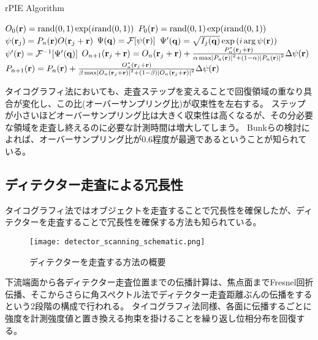 \begin{algorithm}[!ht]
\caption{rPIE Algorithm}         
\label{alg:rpie}                          
\begin{algorithmic}
    \STATE $O_0(\mathbf{r}) = \mathrm{rand}(0,1) \exp(i \mathrm{rand}(0,1) )$
    \STATE $P_0(\mathbf{r}) = \mathrm{rand}(0,1) \exp(i \mathrm{rand}(0,1) )$
        \STATE $\psi(\mathbf{r}_j) = P_n(\mathbf{r}) O(\mathbf{r}_j + \mathbf{r})$
        \STATE $\Psi(\mathbf{q}) = \mathcal F [\psi(\mathbf{r})]$
        \STATE $\Psi'(\mathbf{q}) = \sqrt{I_j(\mathbf{q})} \exp\left( i \arg \psi(\mathbf{r}) \right)$ 
        \STATE $\psi'(\mathbf{r}) = \mathcal F^{-1} [\Psi'(\mathbf{q})]$
        \STATE $O_{n+1}(\mathbf{r}_j + \mathbf{r}) 
          = O_n(\mathbf{r}_j + \mathbf{r}) + \frac{P_n^*(\mathbf{r}_j + \mathbf{r})}
          {\alpha \max \left| P_n(\mathbf{r}) \right|^2 + (1-\alpha) \left| P_n(\mathbf{r}) \right|^2}
          \Delta\psi(\mathbf{r})$
        \STATE $P_{n+1}(\mathbf{r})
          = P_n(\mathbf{r}) + \frac{O_n^*(\mathbf{r}_j + \mathbf{r})}
          {\beta \max \left| O_n(\mathbf{r}_j + \mathbf{r}) \right|^2 + (1-\beta) \left| O_n(\mathbf{r}_j + \mathbf{r}) \right|^2}
          \Delta\psi(\mathbf{r})$
      \ENDFOR
    \ENDFOR
\end{algorithmic}
\end{algorithm}

タイコグラフィ法においても、走査ステップを変えることで回復領域の重なり具合が変化し、この比(オーバーサンプリング比)が収束性を左右する。
ステップが小さいほどオーバーサンプリング比は大きく収束性は高くなるが、その分必要な領域を走査し終えるのに必要な計測時間は増大してしまう。
Bunkらの検討によれば、オーバーサンプリング比が0.6程度が最適であるということが知られている。\cite{Bunk2008}

\subsection{ディテクター走査による冗長性}
\label{chap3_detector_scanninc_introduction}

タイコグラフィ法ではオブジェクトを走査することで冗長性を確保したが、ディテクターを走査することで冗長性を確保する方法も知られている。

\begin{figure}[!ht]
\centering
\texttt{[image: detector\_scanning\_schematic.png]}
\caption{ディテクターを走査する方法の概要}
\label{fig:detector_scanning_schematic}
\end{figure}

下流端面から各ディテクター走査位置までの伝播計算は、焦点面までFresnel回折伝播、そこからさらに角スペクトル法でディテクター走査距離ぶんの伝播をするという2段階の構成で行われる。
タイコグラフィ法同様、各面に伝播するごとに強度を計測強度値と置き換える拘束を掛けることを繰り返し位相分布を回復する。

